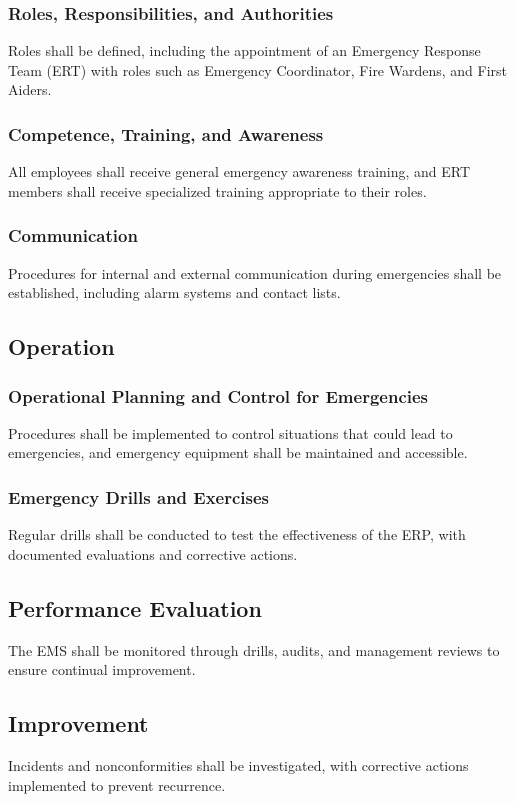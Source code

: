 \documentclass[12pt]{article}
\begin{document}
\subsubsection{Roles, Responsibilities, and Authorities}
Roles shall be defined, including the appointment of an Emergency Response Team (ERT) with roles such as Emergency Coordinator, Fire Wardens, and First Aiders.

\subsubsection{Competence, Training, and Awareness}
All employees shall receive general emergency awareness training, and ERT members shall receive specialized training appropriate to their roles.

\subsubsection{Communication}
Procedures for internal and external communication during emergencies shall be established, including alarm systems and contact lists.

\subsection{Operation}

\subsubsection{Operational Planning and Control for Emergencies}
Procedures shall be implemented to control situations that could lead to emergencies, and emergency equipment shall be maintained and accessible.

\subsubsection{Emergency Drills and Exercises}
Regular drills shall be conducted to test the effectiveness of the ERP, with documented evaluations and corrective actions.

\subsection{Performance Evaluation}
The EMS shall be monitored through drills, audits, and management reviews to ensure continual improvement.

\subsection{Improvement}
Incidents and nonconformities shall be investigated, with corrective actions implemented to prevent recurrence.
\end{document}
